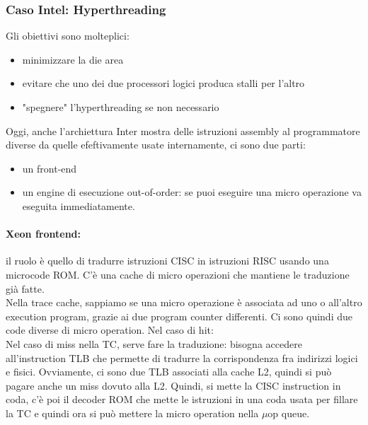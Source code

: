 \documentclass[12pt, oneside]{extbook} %
\begin{document}
\subsubsection{Caso Intel: Hyperthreading}
Gli obiettivi sono molteplici:
\begin{itemize}
\item minimizzare la die area
\item evitare che uno dei due processori logici produca stalli per l'altro
\item "spegnere" l'hyperthreading se non necessario
\end{itemize}
Oggi, anche l'archiettura Inter mostra delle istruzioni assembly al programmatore diverse da quelle efeftivamente usate internamente, ci sono due parti:
\begin{itemize}
\item un front-end
\item un engine di esecuzione out-of-order: se puoi eseguire una micro operazione va eseguita immediatamente.
\end{itemize}
\paragraph{Xeon frontend:}il ruolo è quello di tradurre istruzioni CISC in istruzioni RISC usando una microcode ROM. C'è una cache di micro operazioni che mantiene le traduzione già fatte.\\ Nella trace cache, sappiamo se una micro operazione è associata ad uno o all'altro execution program, grazie ai due program counter differenti. Ci sono quindi due code diverse di micro operation. Nel caso di hit: %
\\ Nel caso di miss nella TC, serve fare la traduzione: bisogna accedere all'instruction TLB che permette di tradurre la corrispondenza fra indirizzi logici e fisici. Ovviamente, ci sono due TLB associati alla cache L2, quindi si può pagare anche un miss dovuto alla L2. Quindi, si mette la CISC instruction in coda, c'è poi il decoder ROM che mette le istruzioni in una coda usata per fillare la TC e quindi ora si può mettere la micro operation nella $\mu$op queue.
\end{document}

